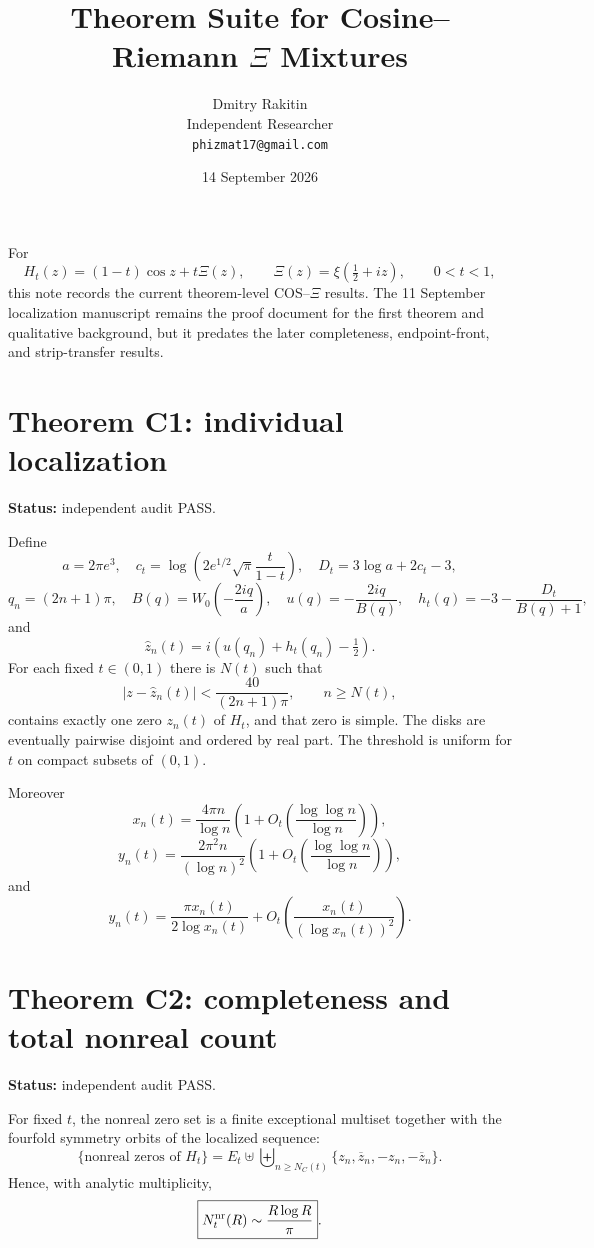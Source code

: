 \documentclass[11pt]{article}
\title{Theorem Suite for Cosine--Riemann $\Xi$ Mixtures}
\author{Dmitry Rakitin\\Independent Researcher\\\texttt{phizmat17@gmail.com}}
\date{14 September 2026}
\begin{document}
\maketitle

For
\[
H_t(z)=(1-t)\cos z+t\Xi(z),\qquad
\Xi(z)=\xi\!\left(\tfrac12+iz\right),\qquad0<t<1,
\]
this note records the current theorem-level COS--$\Xi$ results. The 11 September localization
manuscript remains the proof document for the first theorem and qualitative background, but it
predates the later completeness, endpoint-front, and strip-transfer results.

\section*{Theorem C1: individual localization}
\textbf{Status:} independent audit PASS.

Define
\[
a=2\pi e^3,\quad
c_t=\log\!\left(2e^{1/2}\sqrt{\pi}\frac{t}{1-t}\right),\quad
D_t=3\log a+2c_t-3,
\]
\[
q_n=(2n+1)\pi,\quad
B(q)=W_0\!\left(-\frac{2iq}{a}\right),\quad
u(q)=-\frac{2iq}{B(q)},\quad
h_t(q)=-3-\frac{D_t}{B(q)+1},
\]
and
\[
\widehat z_n(t)=i\!\left(u(q_n)+h_t(q_n)-\tfrac12\right).
\]
For each fixed $t\in(0,1)$ there is $N(t)$ such that
\[
\left|z-\widehat z_n(t)\right|<\frac{40}{(2n+1)\pi},\qquad n\ge N(t),
\]
contains exactly one zero $z_n(t)$ of $H_t$, and that zero is simple. The disks are eventually
pairwise disjoint and ordered by real part. The threshold is uniform for $t$ on compact subsets
of $(0,1)$.

Moreover
\[
x_n(t)=\frac{4\pi n}{\log n}
\left(1+O_t\!\left(\frac{\log\log n}{\log n}\right)\right),
\]
\[
y_n(t)=\frac{2\pi^2n}{(\log n)^2}
\left(1+O_t\!\left(\frac{\log\log n}{\log n}\right)\right),
\]
and
\[
y_n(t)=\frac{\pi x_n(t)}{2\log x_n(t)}
+O_t\!\left(\frac{x_n(t)}{(\log x_n(t))^2}\right).
\]

\section*{Theorem C2: completeness and total nonreal count}
\textbf{Status:} independent audit PASS.

For fixed $t$, the nonreal zero set is a finite exceptional multiset together with the fourfold
symmetry orbits of the localized sequence:
\[
\{\text{nonreal zeros of }H_t\}
=
E_t\uplus
\biguplus_{n\ge N_C(t)}
\{z_n,\overline z_n,-z_n,-\overline z_n\}.
\]
Hence, with analytic multiplicity,
\[
\boxed{N_t^{\rm nr}(R)\sim\frac{R\log R}{\pi}}.
\]
\end{document}
